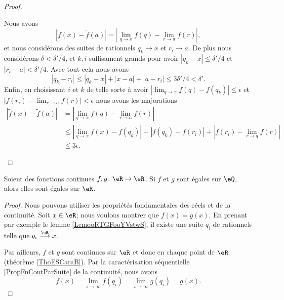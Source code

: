 \begin{proof}
\begin{subproof}
\begin{subproof}
			\spitem[\( a\) et \( x\) irrationnels]
			Nous avons
			\begin{equation}
				| \tilde f(x)-\tilde f(a) |=| \lim_{q\to x} f(q)-\lim_{r\to a} f(r) |,
			\end{equation}
			et nous considérons des suites de rationnels \( q_k\to x\) et \( r_i\to a\). De plus nous considérons \( \delta<\delta'/4\), et \( k,i\) suffisament grands pour avoir \( | q_k-x |\leq \delta'/4\) et \( | r_i-a |<\delta'/4\). Avec tout cela nous avons
			\begin{equation}
				| q_k-r_i |\leq | q_k-x |+| x-a |+| a-r_i |\leq 3\delta'/4<\delta'.
			\end{equation}
			Enfin, en choisissant \( i\) et \( k\) de telle sorte à avoir \( | \lim_{q\to x} f(q)-f(q_k) |\leq \epsilon\) et \( | f(r_i)-\lim_{r\to a} f(r) |<\epsilon\) nous avons les majorations
			\begin{subequations}
				\begin{align}
					| \tilde f(x)-\tilde f(a) | & =| \lim_{q\to x} f(q)-\lim_{r\to a} f(r) |                                         \\
					                            & \leq | \lim_{q\to x} f(x)-f(q_k) |+| f(q_k)-f(r_i) |+| f(r_i)-\lim_{r\to q} f(r) | \\
					                            & \leq 3\epsilon.
				\end{align}
			\end{subequations}
		\end{subproof}
	\end{subproof}
\end{proof}

\begin{proposition}     \label{PROPooXWHYooFiVYfi}
	Soient des fonctions continues \( f,g\colon \eR\to \eR\). Si \( f\) et \( g\) sont égales sur \( \eQ\), alors elles sont égales sur \( \eR\).
\end{proposition}

\begin{proof}
	Nous pouvons utiliser les propriétés fondamentales des réels et de la continuité. Soit \( x\in \eR\); nous voulons montrer que \( f(x)=g(x)\). En prenant par exemple le lemme \ref{LemooRTGFooYVstwS}, il existe une suite \( q_i\) de rationnels telle que \( q_i\stackrel{\eR}{\longrightarrow}x\).

	Par ailleurs, \( f\) et \( g\) sont continues sur \( \eR\) et donc en chaque point de \( \eR\) (théorème \ref{ThoESCaraB}). Par la caractérisation séquentielle \ref{PropFnContParSuite} de la continuité, nous avons
	\begin{equation}
		f(x)=\lim_{i\to \infty} f(q_i)=\lim_{i\to \infty} g(q_i)=g(x).
	\end{equation}
\end{proof}


